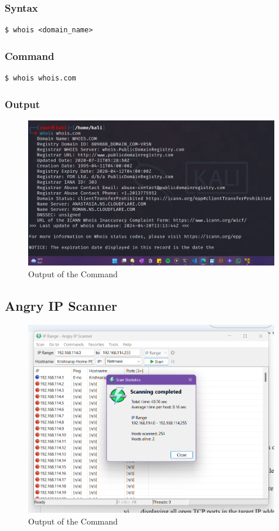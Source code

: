 \documentclass[11pt]{article}
\begin{document}
\subsubsection*{Syntax}
\begin{verbatim}
$ whois <domain_name>
\end{verbatim}

\subsubsection*{Command}
\begin{verbatim}
$ whois whois.com
\end{verbatim}

\subsubsection*{Output}
\begin{figure}[H]
    \centering
    \includegraphics[width=0.99\textwidth]{whois (1).png}
    \caption{Output of the Command}
\end{figure}

\subsection{Angry IP Scanner}
\begin{figure}[H]
    \centering
    \includegraphics[width=0.99\textwidth]{angryip.png}
    \caption{Output of the Command}
\end{figure}
\end{document}
